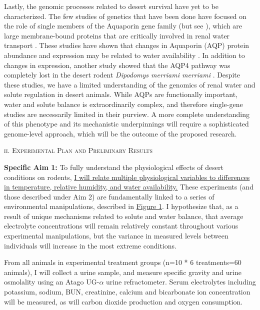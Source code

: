 \documentclass[12pt]{article}
\begin{document}
Lastly, the genomic processes related to desert survival have yet to be characterized. The few studies of genetics that have been done have focused on the role of single members of the Aquaporin gene family (but see \cite{Bartolo:2007hy}), which are large membrane-bound proteins that are critically involved in renal water transport \citep{Kwon:2009bv,Verkman:2002ww,Brown:1995vo,Nielsen:1995cb}. These studies have shown that changes in Aquaporin (AQP) protein abundance and expression may be related to water availability \citep{Boselt:2009fb, Gallardo:2005fm,Bozinovic:2003eg}. In addition to changes in expression, another study showed that the AQP4 pathway was completely lost in the desert rodent \textit{Dipodomys merriami merriami} \citep{Huang:2001ti}. Despite these studies, we have a limited understanding of the genomics of renal water and solute regulation in desert animals. While AQPs are functionally important, water and solute balance is extraordinarily complex, and therefore single-gene studies are necessarily limited in their purview. A more complete understanding of this phenotype and its mechanistic underpinnings will require a sophisticated genome-level approach, which will be the outcome of the proposed research. 

\begin{center}
\textsc{{ii. Experimental Plan and Preliminary Results}} \\
\end{center}


\textbf{Specific Aim 1:} To fully understand the physiological effects of desert conditions on rodents, \ul{I will relate multiple physiological variables to differences in temperature, relative humidity, and water availability.} These experiments (and those described under Aim 2) are fundamentally linked to a series of environmental manipulations, described in \hyperlink{Figure 1}{Figure 1}. I hypothesize that, as a result of unique mechanisms related to solute and water balance, that average electrolyte concentrations will remain relatively constant throughout various experimental manipulations, but the variance in measured levels between individuals will increase in the most extreme conditions.


From all animals in experimental treatment groups (n=10 * 6 treatments=60 animals), I will collect a urine sample, and measure specific gravity and urine osmolality using an Atago UG-$\alpha$ urine refractometer. Serum electrolytes including potassium, sodium, BUN, creatinine, calcium and bicarbonate ion concentration will be measured, as will carbon dioxide production and oxygen consumption.
\end{document}
